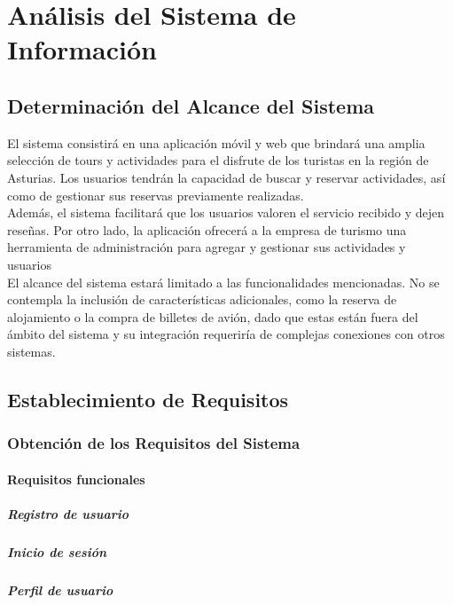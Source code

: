 \chapter{Análisis del Sistema de Información}
\section{Determinación del Alcance del Sistema}
El sistema consistirá en una aplicación móvil y web que brindará una amplia selección de tours y actividades para el disfrute de los turistas en la región de Asturias. Los usuarios tendrán la capacidad de buscar y reservar actividades, así como de gestionar sus reservas previamente realizadas.\\[1ex]
Además, el sistema facilitará que los usuarios valoren el servicio recibido y dejen reseñas. Por otro lado, la aplicación ofrecerá a la empresa de turismo una herramienta de administración para agregar y gestionar sus actividades y usuarios\\[1ex]
El alcance del sistema estará limitado a las funcionalidades mencionadas. No se contempla la inclusión de características adicionales, como la reserva de alojamiento o la compra de billetes de avión, dado que estas están fuera del ámbito del sistema y su integración requeriría de complejas conexiones con otros sistemas.
\section{Establecimiento de Requisitos}
\subsection{Obtención de los Requisitos del Sistema}
\subsubsection{Requisitos funcionales}
\paragraph{Registro de usuario}

\paragraph{Inicio de sesión}

\paragraph{Perfil de usuario}

